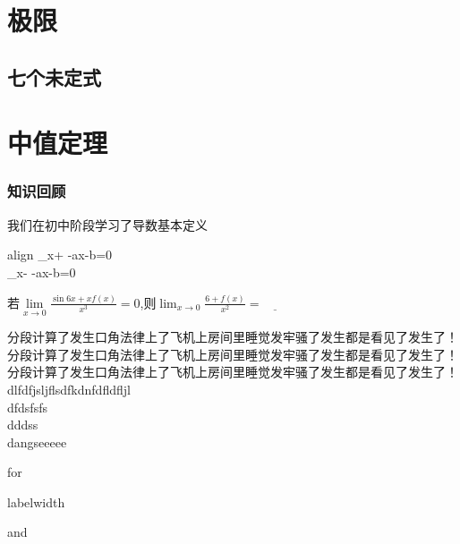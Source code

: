 \documentclass[no-math]{course}
\begin{document}
	\raggedbottom
	\abovedisplayshortskip=5pt
	\belowdisplayshortskip=5pt
	\abovedisplayskip=5pt
	\belowdisplayskip=5pt
	\frontmatter
		\tableofcontents
	\mainmatter
	\chapter{极限}
	\section{七个未定式}
	\chapter{中值定理}
	\begin{paracol}{2}

	\switchcolumn
		\subsection{知识回顾}
			我们在初中阶段学习了导数基本定义
		\begin{empheq}
		[box=\eqmybox]{align}
			\lim_{x\to+\infty} -ax-b=0 \\
			\lim_{x\to-\infty} -ax-b=0
		\end{empheq}

	\begin{examples}
		若$\lim\limits_{x\to0}{\frac{\sin{6x}+xf(x)}{x^3}}=0$,则$\lim_{x\to0}{\frac{6+f(x)}{x^2}}=\underline{\qquad}$
	\end{examples}

	\begin{analysis}
			分段计算了发生口角法律上了飞机上房间里睡觉发牢骚了发生都是看见了发生了！
			分段计算了发生口角法律上了飞机上房间里睡觉发牢骚了发生都是看见了发生了！
			分段计算了发生口角法律上了飞机上房间里睡觉发牢骚了发生都是看见了发生了！
	dlfdfjsljflsdfkdnfdfldfljl \\
	dfdsfsfs \\
	dddss\\
	dangseeeee
	\end{analysis}

\end{paracol}

	\begin{Exercise}
	\begin{exercises}
		\item for
		\item labelwidth
		\item and
	\end{exercises}
\end{Exercise}
\end{document}
